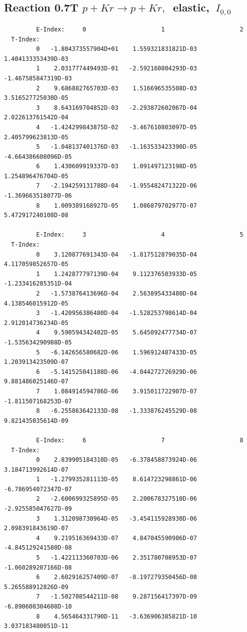 \documentclass[12pt,dvips]{article}
\begin{document}
\subsection{
Reaction 0.7T  $p + Kr \rightarrow p + Kr ,\ $
 elastic, $\  I_{0,0}$
}

\begin{small}\begin{verbatim}
         E-Index:     0                     1                     2
  T-Index:
         0   -1.804373557904D+01    1.559321831821D-03    1.404133353439D-03
         1    2.031777449493D-01   -2.592160804293D-03   -1.467585847319D-03
         2    9.686882765703D-03    1.516696535508D-03    3.516527725030D-05
         3    8.643169704852D-03   -2.293872602067D-04    2.022613761542D-04
         4   -1.424299843875D-02   -3.467610803097D-05    2.405799623813D-05
         5   -1.048137401376D-03   -1.163533423390D-05   -4.664386608096D-05
         6    1.430609919337D-03    1.091497123198D-05    1.254896476704D-05
         7   -2.194259131788D-04   -1.955482471322D-06   -1.369663518077D-06
         8    1.009389168927D-05    1.086879702977D-07    5.472917240108D-08

         E-Index:     3                     4                     5
  T-Index:
         0    3.120877691343D-04   -1.817512879035D-04    4.117059852657D-05
         1    1.242877797139D-04    9.112376503933D-05   -1.233416285351D-04
         2   -1.573876413696D-04    2.563895433480D-04    4.138546015912D-05
         3   -1.420956386480D-04   -1.528253798614D-04    2.912014736234D-05
         4    9.590594342402D-05    5.645092477734D-07   -1.535634290988D-05
         5   -6.142656580682D-06    1.596912487433D-05    1.203913423509D-07
         6   -5.141525041188D-06   -4.044272726929D-06    9.881486025146D-07
         7    1.084914594786D-06    3.915011722907D-07   -1.811507168253D-07
         8   -6.255863642133D-08   -1.333876245529D-08    9.821435035614D-09

         E-Index:     6                     7                     8
  T-Index:
         0    2.839905184310D-05   -6.378458873924D-06    3.184713992614D-07
         1   -1.279935281113D-05    8.614723298861D-06   -6.786954072347D-07
         2   -2.600699325895D-05    2.200678327510D-06   -2.925585047627D-09
         3    1.312098730964D-05   -3.454115928930D-06    2.098391843619D-07
         4    9.219516369433D-07    4.847045590986D-07   -4.845129241580D-08
         5   -1.422113360703D-06    2.351780708953D-07   -1.060289207166D-08
         6    2.602916257409D-07   -8.197279350456D-08    5.265588912826D-09
         7   -1.502708544211D-08    9.287156417397D-09   -6.890608304608D-10
         8    4.565464331790D-11   -3.636906385821D-10    3.037183480051D-11
\end{verbatim}\end{small}
\end{document}

